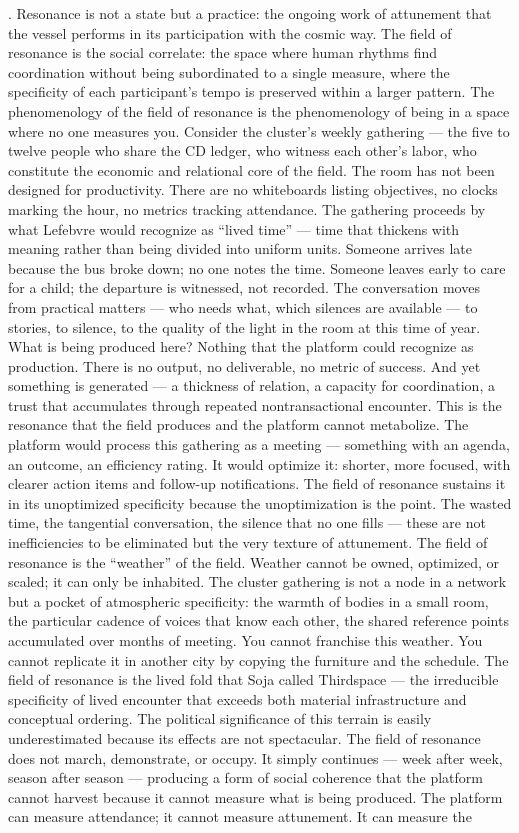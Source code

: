 \cite[pp.~51--78]{simondon_2017}. Resonance is not a state but a practice: the ongoing work of attunement that the vessel performs in its participation with the cosmic way. The field of resonance is the social correlate: the space where human rhythms find coordination without being subordinated to a single measure, where the specificity of each participant’s tempo is preserved within a larger pattern. The phenomenology of the field of resonance is the phenomenology of being in a space where no one measures you. Consider the cluster’s weekly gathering — the five to twelve people who share the CD ledger, who witness each other’s labor, who constitute the economic and relational core of the field. The room has not been designed for productivity. There are no whiteboards listing objectives, no clocks marking the hour, no metrics tracking attendance. The gathering proceeds by what Lefebvre would recognize as “lived time” — time that thickens with meaning rather than being divided into uniform units. Someone arrives late because the bus broke down; no one notes the time. Someone leaves early to care for a child; the departure is witnessed, not recorded. The conversation moves from practical matters — who needs what, which silences are available — to stories, to silence, to the quality of the light in the room at this time of year. What is being produced here? Nothing that the platform could recognize as production. There is no output, no deliverable, no metric of success. And yet something is generated — a thickness of relation, a capacity for coordination, a trust that accumulates through repeated nontransactional encounter. This is the resonance that the field produces and the platform cannot metabolize. The platform would process this gathering as a meeting — something with an agenda, an outcome, an efficiency rating. It would optimize it: shorter, more focused, with clearer action items and follow-up notifications. The field of resonance sustains it in its unoptimized specificity because the unoptimization is the point. The wasted time, the tangential conversation, the silence that no one fills — these are not inefficiencies to be eliminated but the very texture of attunement. The field of resonance is the “weather” of the field. Weather cannot be owned, optimized, or scaled; it can only be inhabited. The cluster gathering is not a node in a network but a pocket of atmospheric specificity: the warmth of bodies in a small room, the particular cadence of voices that know each other, the shared reference points accumulated over months of meeting. You cannot franchise this weather. You cannot replicate it in another city by copying the furniture and the schedule. The field of resonance is the lived fold that Soja called Thirdspace — the irreducible specificity of lived encounter that exceeds both material infrastructure and conceptual ordering. The political significance of this terrain is easily underestimated because its effects are not spectacular. The field of resonance does not march, demonstrate, or occupy. It simply continues — week after week, season after season — producing a form of social coherence that the platform cannot harvest because it cannot measure what is being produced. The platform can measure attendance; it cannot measure attunement. It can measure the 